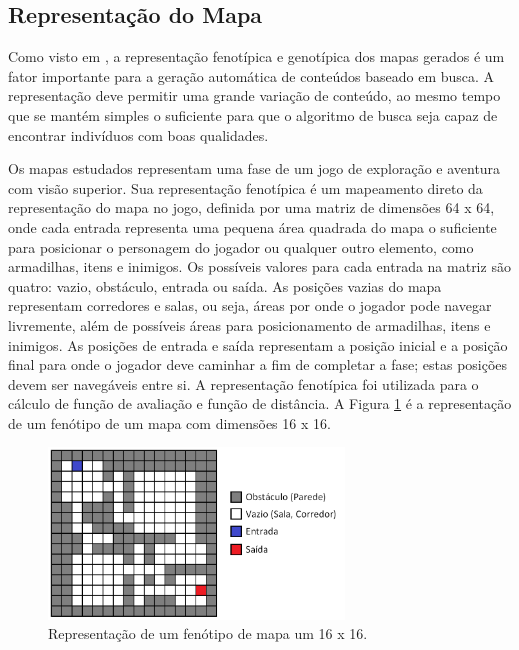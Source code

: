 \subsection{Representação do Mapa}

Como visto em \cite{cardamone2011evolving}, a representação fenotípica e genotípica dos mapas gerados é um fator importante para a geração automática de conteúdos baseado em busca. A representação deve permitir uma grande variação de conteúdo, ao mesmo tempo que se mantém simples o suficiente para que o algoritmo de busca seja capaz de encontrar indivíduos com boas qualidades.

Os mapas estudados representam uma fase de um jogo de exploração e aventura com visão superior. Sua representação fenotípica é um mapeamento direto da representação do mapa no jogo, definida por uma matriz de dimensões 64 x 64, onde cada entrada representa uma pequena área quadrada do mapa o suficiente para posicionar o personagem do jogador ou qualquer outro elemento, como armadilhas, itens e inimigos. Os possíveis valores para cada entrada na matriz são quatro: vazio, obstáculo, entrada ou saída. As posições vazias do mapa representam corredores e salas, ou seja, áreas por onde o jogador pode navegar livremente, além de possíveis áreas para posicionamento de armadilhas, itens e inimigos. As posições de entrada e saída representam a posição inicial e a posição final para onde o jogador deve caminhar a fim de completar a fase; estas posições devem ser navegáveis entre si. A representação fenotípica foi utilizada para o cálculo de função de avaliação e função de distância. A Figura \ref{fig:dev_phenotype} é a representação de um fenótipo de um mapa com dimensões 16 x 16.

\begin{figure}[htb]
	\begin{center}
		\includegraphics[width=0.7\textwidth]{Imagens/dev_phenotype.png}
		\caption{Representação de um fenótipo de mapa um 16 x 16.}
		\label{fig:dev_phenotype}
	\end{center}
\end{figure}

